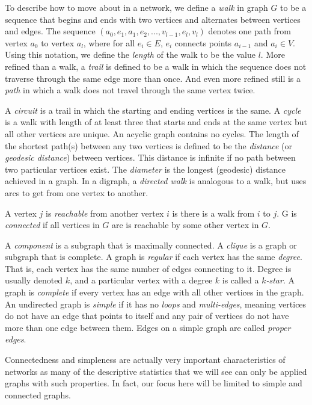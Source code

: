 \documentclass[12pt,twoside]{amherstthesis}
\begin{document}
  To describe how to move about in a network, we define a \emph{walk} in
  graph \(G\) to be a sequence that begins and ends with two vertices and
  alternates between vertices and edges. The sequence
  \((a_0, e_1, a_1, e_2, ..., v_{l-1}, e_l, v_l)\) denotes one path from
  vertex \(a_0\) to vertex \(a_l\), where for all \(e_i \in E\), \(e_i\)
  connects points \(a_{i-1}\) and \(a_i \in V\). Using this notation, we
  define the \emph{length} of the walk to be the value \(l\). More refined
  than a walk, a \emph{trail} is defined to be a walk in which the
  sequence does not traverse through the same edge more than once. And
  even more refined still is a \emph{path} in which a walk does not travel
  through the same vertex twice.
  
  A \emph{circuit} is a trail in which the starting and ending vertices is
  the same. A \emph{cycle} is a walk with length of at least three that
  starts and ends at the same vertex but all other vertices are unique. An
  acyclic graph contains no cycles. The length of the shortest path(s)
  between any two vertices is defined to be the \emph{distance} (or
  \emph{geodesic distance}) between vertices. This distance is infinite if
  no path between two particular vertices exist. The \emph{diameter} is
  the longest (geodesic) distance achieved in a graph. In a digraph, a
  \emph{directed walk} is analogous to a walk, but uses arcs to get from
  one vertex to another.
  
  A vertex \(j\) is \emph{reachable} from another vertex \(i\) is there is
  a walk from \(i\) to \(j\). G is \emph{connected} if all vertices in
  \(G\) are is reachable by some other vertex in \(G\).
  
  A \emph{component} is a subgraph that is maximally connected. A
  \emph{clique} is a graph or subgraph that is complete. A graph is
  \emph{regular} if each vertex has the same \emph{degree}. That is, each
  vertex has the same number of edges connecting to it. Degree is usually
  denoted \(k\), and a particular vertex with a degree \(k\) is called a
  \emph{\(k\)-star}. A graph is \emph{complete} if every vertex has an
  edge with all other vertices in the graph. An undirected graph is
  \emph{simple} if it has no \emph{loops} and \emph{multi-edges}, meaning
  vertices do not have an edge that points to itself and any pair of
  vertices do not have more than one edge between them. Edges on a simple
  graph are called \emph{proper edges}.
  
  Connectedness and simpleness are actually very important characteristics
  of networks as many of the descriptive statistics that we will see can
  only be applied graphs with such properties. In fact, our focus here
  will be limited to simple and connected graphs.
  
\end{document}
